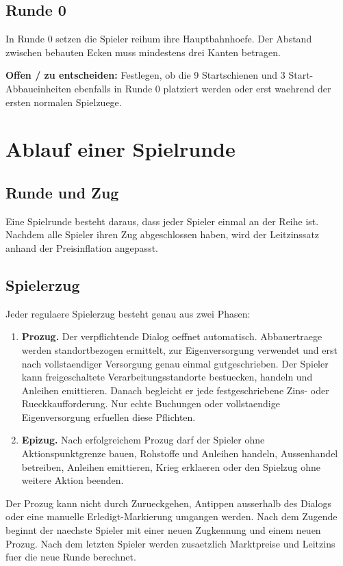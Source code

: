 \documentclass[11pt,a4paper,oneside,parskip=half]{scrreprt}
\newcommand{\begriff}[1]{\textbf{#1}}
\newcommand{\offen}[1]{\begin{framed}\noindent\textbf{Offen / zu entscheiden:} #1\end{framed}}
\begin{document}
\section{Runde 0}
In Runde 0 setzen die Spieler reihum ihre Hauptbahnhoefe. Der Abstand zwischen bebauten Ecken muss mindestens drei Kanten betragen.

\offen{Festlegen, ob die 9 Startschienen und 3 Start-Abbaueinheiten ebenfalls in Runde 0 platziert werden oder erst waehrend der ersten normalen Spielzuege.}

\chapter{Ablauf einer Spielrunde}

\section{Runde und Zug}
Eine Spielrunde besteht daraus, dass jeder Spieler einmal an der Reihe ist. Nachdem alle Spieler ihren Zug abgeschlossen haben, wird der Leitzinssatz anhand der Preisinflation angepasst.

\section{Spielerzug}
Jeder regulaere Spielerzug besteht genau aus zwei Phasen:
\begin{enumerate}
  \item \begriff{Prozug.} Der verpflichtende Dialog oeffnet automatisch. Abbauertraege werden standortbezogen ermittelt, zur Eigenversorgung verwendet und erst nach vollstaendiger Versorgung genau einmal gutgeschrieben. Der Spieler kann freigeschaltete Verarbeitungsstandorte bestuecken, handeln und Anleihen emittieren. Danach begleicht er jede festgeschriebene Zins- oder Rueckkaufforderung. Nur echte Buchungen oder vollstaendige Eigenversorgung erfuellen diese Pflichten.
  \item \begriff{Epizug.} Nach erfolgreichem Prozug darf der Spieler ohne Aktionspunktgrenze bauen, Rohstoffe und Anleihen handeln, Aussenhandel betreiben, Anleihen emittieren, Krieg erklaeren oder den Spielzug ohne weitere Aktion beenden.
\end{enumerate}

Der Prozug kann nicht durch Zurueckgehen, Antippen ausserhalb des Dialogs oder eine manuelle Erledigt-Markierung umgangen werden. Nach dem Zugende beginnt der naechste Spieler mit einer neuen Zugkennung und einem neuen Prozug. Nach dem letzten Spieler werden zusaetzlich Marktpreise und Leitzins fuer die neue Runde berechnet.
\end{document}
